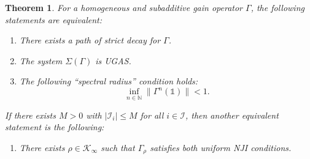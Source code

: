 \documentclass[10pt, oneside, a4paper]{article}
\newcommand{\N}{\mathbb{N}}
\newcommand{\unit}{\mathds{1}}
\newcommand{\IC}{\mathcal{I}}
\newcommand{\KC}{\mathcal{K}}
\newtheorem{theorem}{Theorem}[section]
\begin{document}
\begin{theorem}\label{thm_homogeneous_subadditive}
For a homogeneous and subadditive gain operator $\Gamma$, the following statements are equivalent:%
\begin{enumerate}
\item[(a)] There exists a path of strict decay for $\Gamma$.%
\item[(b)] The system $\Sigma(\Gamma)$ is UGAS.%
\item[(c)] The following ``spectral radius'' condition holds:%
\begin{equation}\label{eq_spectralradius_condition}
  \inf_{n \in \N} \|\Gamma^n(\unit)\| < 1.%
\end{equation}
\end{enumerate}
If there exists $M > 0$ with $|\IC_i| \leq M$ for all $i \in \IC$, then another equivalent statement is the following:%
\begin{enumerate}
\item[(d)] There exists $\rho \in \KC_{\infty}$ such that $\Gamma_{\rho}$ satisfies both uniform NJI conditions.
\end{enumerate}
\end{theorem}
\end{document}
